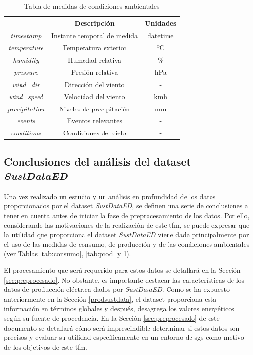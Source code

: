 \begin{table}[h!]
    \centering
    \begin{tabular}{|c|c|c|}
    \hline
    \rowcolor[HTML]{AAAAAA} 
    \multicolumn{1}{|c|}{\cellcolor[HTML]{AAAAAA}Campo} & \multicolumn{1}{c|}{\cellcolor[HTML]{AAAAAA}Descripción} & Unidades \\ \hline
    \textit{timestamp} & Instante temporal de medida & datetime \\ \hline
    \textit{temperature} & Temperatura exterior & ºC \\ \hline
    \textit{humidity} & Humedad relativa & \% \\ \hline
    \textit{pressure} & Presión relativa & hPa \\ \hline
    \textit{wind\_dir} & Dirección del viento & - \\ \hline
    \textit{wind\_speed} & Velocidad del viento & kmh \\ \hline
    \textit{precipitation} & Niveles de precipitación & mm \\ \hline
    \textit{events} & Eventos relevantes & - \\ \hline
    \textit{conditions} & Condiciones del cielo & - \\ \hline
    \end{tabular}
    \caption{Tabla de medidas de condiciones ambientales \cite{sustdata}}
    \label{tab:env}
\end{table}

\subsection{Conclusiones del análisis del dataset \textit{SustDataED}}
\label{sec:conclusionessustdata}

Una vez realizado un estudio y un análisis en profundidad de los datos proporcionados por el dataset \textit{SustDataED}, se definen una serie de conclusiones a tener en cuenta antes de iniciar la fase de preprocesamiento de los datos. Por ello, considerando las motivaciones de la realización de este \gls{tfm}, se puede expresar que la utilidad que proporciona el dataset \textit{SustDataED} viene dada principalmente por el uso de las medidas de consumo, de producción y de las condiciones ambientales (ver Tablas \ref{tab:consumo}, \ref{tab:prod} y \ref{tab:env}). 

\vspace{3mm}

El procesamiento que será requerido para estos datos se detallará en la Sección \ref{sec:preprocesado}. No obstante, es importante destacar las características de los datos de producción eléctrica dados por \textit{SustDataED}. Como se ha expuesto anteriormente en la Sección \ref{prodsustdata}, el dataset proporciona esta información en términos globales y después, desagrega los valores energéticos según su fuente de procedencia. En la Sección \ref{sec:preprocesado} de este documento se detallará cómo será imprescindible determinar si estos datos son precisos y evaluar su utilidad específicamente en un entorno de \gls{sg}s como motivo de los objetivos de este \gls{tfm}.

